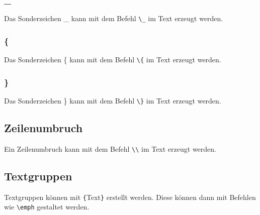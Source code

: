\documentclass[
12pt
]{scrreprt}
\begin{document}
\subsubsection{\_}
Das Sonderzeichen \_ kann mit dem Befehl \verb!\_! im Text erzeugt werden.
\subsubsection{\{}
Das Sonderzeichen \{ kann mit dem Befehl \verb!\{! im Text erzeugt werden.
\subsubsection{\}}
Das Sonderzeichen \} kann mit dem Befehl \verb!\}! im Text erzeugt werden.
\subsection{Zeilenumbruch}
Ein Zeilenumbruch kann mit dem Befehl \verb!\\! im Text erzeugt werden.
\subsection{Textgruppen}
Textgruppen können mit \verb!{!Text\verb!}! erstellt werden. Diese können dann mit Befehlen wie \verb!\emph! gestaltet werden.
\end{document}
